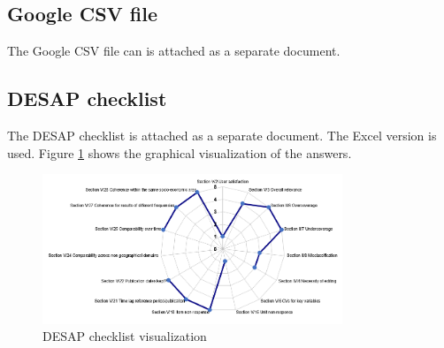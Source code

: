 \documentclass[12pt,a4paper,paper=a4,oneside,titlepage,pdftex]{scrartcl}
\begin{document}
\subsection{Google CSV file}
The Google CSV file can is attached as a separate document.

\subsection{DESAP checklist}
The DESAP checklist is attached as a separate document. The Excel version is used. Figure \ref{fig:desap} shows the graphical visualization of the answers.

\begin{figure}[h!]
    \centering
    \includegraphics[width=0.8\textwidth]{figures/desap-graph.PNG}
    \caption{DESAP checklist visualization}
    \label{fig:desap}
\end{figure}
\end{document}
